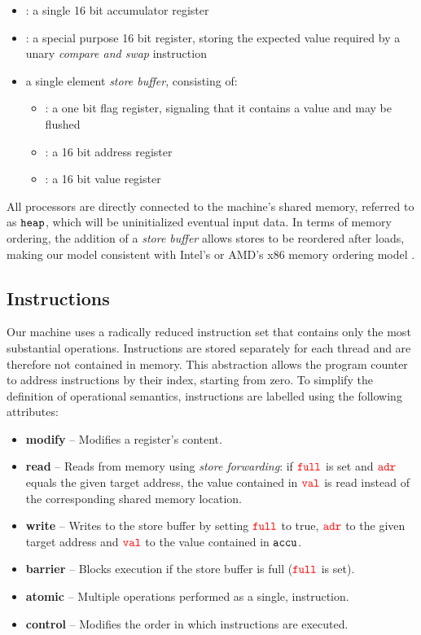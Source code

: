 \begin{itemize}
  \item \ACCU: a single 16 bit accumulator register
  \item \MEM: a special purpose 16 bit register, storing the expected value required by a unary \emph{compare and swap} instruction
  \item a single element \emph{store buffer}, consisting of:
    \begin{itemize}
      \item \SBFULL: a one bit flag register, signaling that it contains a value and may be flushed
      \item \SBADR: a 16 bit address register
      \item \SBVAL: a 16 bit value register
    \end{itemize}
\end{itemize}

All processors are directly connected to the machine's shared memory, referred to as $\texttt{heap}$, which will be uninitialized  eventual input data.
In terms of memory ordering, the addition of a \emph{store buffer} allows stores to be reordered after loads, making our model consistent with Intel's or AMD's x86 memory ordering model \cite{ref:Intel, ref:AMD}.

\subsection{Instructions}

Our machine uses a radically reduced instruction set that contains only the most substantial operations.
Instructions are stored separately for each thread and are therefore not contained in memory.
This abstraction allows the program counter to address instructions by their index, starting from zero.
To simplify the definition of operational semantics, instructions are labelled using the following attributes:

\begin{itemize}
  \item \textbf{modify} -- Modifies a register's content.
  \item \textbf{read} -- Reads from memory using \emph{store forwarding}: if ${\color{red}\texttt{full}}$ is set and ${\color{red}\texttt{adr}}$ equals the given target address, the value contained in ${\color{red}\texttt{val}}$ is read instead of the corresponding shared memory location.
  \item \textbf{write} -- Writes to the store buffer by setting ${\color{red}\texttt{full}}$ to true, ${\color{red}\texttt{adr}}$ to the given target address and ${\color{red}\texttt{val}}$ to the value contained in $\texttt{accu}$.
  \item \textbf{barrier} -- Blocks execution if the store buffer is full (${\color{red}\texttt{full}}$ is set). %
  \item \textbf{atomic} -- Multiple operations performed as a single,  instruction.%
  \item \textbf{control} -- Modifies the order in which instructions are executed.
\end{itemize}


